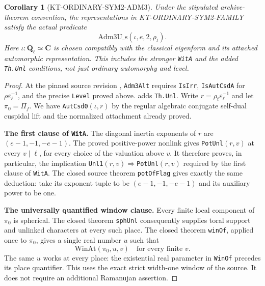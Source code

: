 \documentclass[11pt,a4paper]{article}
\newtheorem{corollary}[theorem]{Corollary}
\theoremstyle{definition}
\renewcommand{\paragraph}[1]{\par\smallskip\noindent\textbf{#1}\quad\ignorespaces}
\begin{document}
\begin{corollary}[KT-ORDINARY-SYM2-ADM3]
Under the stipulated archive-theorem convention, the
representations in KT-ORDINARY-SYM2-FAMILY satisfy the actual
predicate
\[
                 \mathrm{Adm3U\_s}(\iota,e,2,\rho_t).          \tag{OS.10}
\]
Here $\iota:\overline{\mathbf Q}_\ell\simeq\mathbf C$ is
chosen compatibly with the classical eigenform and its
attached automorphic representation. This includes the
stronger \texttt{WitA} and the added \texttt{Th.Unl}
conditions, not just ordinary automorphy and level.
\end{corollary}
\begin{proof}
At the pinned source revision
,
\texttt{Adm3Alt} requires \texttt{IsIrr},
\texttt{IsAutCsdA} for $\rho\varepsilon_\ell^{-1}$, and
the precise \texttt{Level} proved above.
 adds \texttt{Th.Unl}.
Write $r=\rho_t\varepsilon_\ell^{-1}$ and let
$\pi_0=\Pi_f$. We have \texttt{AutCsd0}$(\iota,r)$ by the
regular algebraic conjugate self-dual cuspidal lift and
the normalized attachment already proved.

\paragraph{The first clause of \texttt{WitA}.}
The diagonal inertia exponents of $r$ are
$(e-1,-1,-e-1)$. The proved positive-power nonlink gives
\texttt{PotUnl}$(r,v)$ at every $v\mid\ell$, for every
choice of the valuation above $v$. It therefore proves,
in particular, the implication
\texttt{Unl1}$(r,v)\Rightarrow$\texttt{PotUnl}$(r,v)$
required by the first clause of \texttt{WitA}. The closed
source theorem \texttt{potOfFlag} gives exactly the same
deduction: take its exponent tuple to be
$(e-1,-1,-e-1)$ and its auxiliary power to be one.

\paragraph{The universally quantified window clause.}
Every finite local component of $\pi_0$ is spherical.
The closed theorem \texttt{sphUnl} consequently supplies
toral support and unlinked characters at every such place.
The closed theorem \texttt{winOf}, applied once to $\pi_0$,
gives a single real number $u$ such that
\[
                  \mathrm{WinAt}(\pi_0,u,v)
                        \quad\text{for every finite }v.     \tag{OS.11}
\]
The same $u$ works at every place: the existential real
parameter in \texttt{WinOf} precedes its place quantifier.
This uses the exact strict width-one window of the source.
It does not require an additional Ramanujan assertion.


\end{proof}
\end{document}

